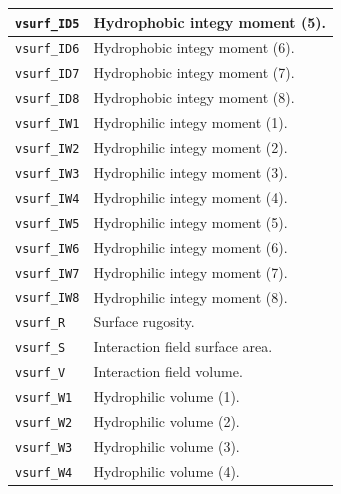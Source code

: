 \documentclass[12pt,a4paper]{article}
\begin{document}
\begin{longtable}{@{\zz}|p{}|p{}|}
\texttt{vsurf\_ID5} & Hydrophobic integy moment (5).\\ \hline

\texttt{vsurf\_ID6} & Hydrophobic integy moment (6).\\ \hline

\texttt{vsurf\_ID7} & Hydrophobic integy moment (7).\\ \hline

\texttt{vsurf\_ID8} & Hydrophobic integy moment (8).\\ \hline

\texttt{vsurf\_IW1} & Hydrophilic integy moment (1).\\ \hline

\texttt{vsurf\_IW2} & Hydrophilic integy moment (2).\\ \hline

\texttt{vsurf\_IW3} & Hydrophilic integy moment (3).\\ \hline

\texttt{vsurf\_IW4} & Hydrophilic integy moment (4).\\ \hline

\texttt{vsurf\_IW5} & Hydrophilic integy moment (5).\\ \hline

\texttt{vsurf\_IW6} & Hydrophilic integy moment (6).\\ \hline

\texttt{vsurf\_IW7} & Hydrophilic integy moment (7).\\ \hline

\texttt{vsurf\_IW8} & Hydrophilic integy moment (8).\\ \hline

\texttt{vsurf\_R} & Surface rugosity.\\ \hline

\texttt{vsurf\_S} & Interaction field surface area.\\ \hline

\texttt{vsurf\_V} & Interaction field volume.\\ \hline

\texttt{vsurf\_W1} & Hydrophilic volume (1).\\ \hline

\texttt{vsurf\_W2} & Hydrophilic volume (2).\\ \hline

\texttt{vsurf\_W3} & Hydrophilic volume (3).\\ \hline

\texttt{vsurf\_W4} & Hydrophilic volume (4).\\ \hline


\end{longtable}
\end{document}

